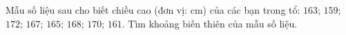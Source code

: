 \begin{ex}
Mẫu số liệu sau cho biết chiều cao (đơn vị: cm) của các bạn trong tổ: $163$; $159$; $172$; $167$; $165$; $168$; $170$; $161$. Tìm khoảng biến thiên của mẫu số liệu.
\end{ex}
